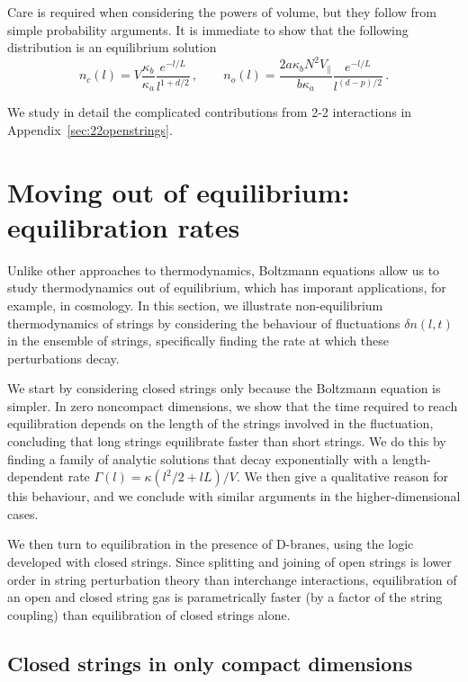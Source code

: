 \documentclass[a4paper,11pt]{article}
\begin{document}
Care is required when considering the powers of volume, but they follow from simple probability arguments.
It is immediate to show that the following distribution is an equilibrium solution
\begin{equation}\label{eq:solgeneral}
    n_c(l)=V\frac{\kappa_b}{\kappa_a}\frac{e^{-l/L}}{l^{1+d/2}}\, , \qquad n_o(l)=\frac{2a\kappa_bN^2V_\parallel}{b \kappa_a}\frac{e^{-l/L}}{l^{(d-p)/2}}\, .
\end{equation}

We study in detail the complicated contributions from 2-2 interactions in Appendix~\ref{sec:22openstrings}.

\section{Moving out of equilibrium: equilibration rates}\label{sec:perturbations}

Unlike other approaches to thermodynamics, Boltzmann equations allow us to 
study thermodynamics out of equilibrium, which has imporant applications,
for example, in cosmology. In this section, we illustrate non-equilibrium
thermodynamics of strings by considering the behaviour of fluctuations 
$\delta n (l,t)$ in the ensemble of strings, specifically finding the rate at
which these perturbations decay. 

We start by considering closed strings only because the Boltzmann equation is
simpler.
In zero noncompact dimensions, we show that the time required to reach equilibration depends on the length of the strings involved in the fluctuation, concluding that long strings equilibrate faster than short strings.
We do this by finding a family of analytic solutions that decay exponentially with a length-dependent rate $\Gamma(l)=\kappa(l^2/2+l L)/V$.
We then give a qualitative reason for this behaviour, and we conclude with similar arguments in the higher-dimensional cases.

We then turn to equilibration in the presence of D-branes, using the logic
developed with closed strings. Since splitting
and joining of open strings is lower order in string perturbation theory
than interchange interactions, equilibration of an open and closed string gas
is parametrically faster (by a factor of the string coupling) 
than equilibration of closed strings alone.

\subsection{Closed strings in only compact dimensions}
\end{document}

